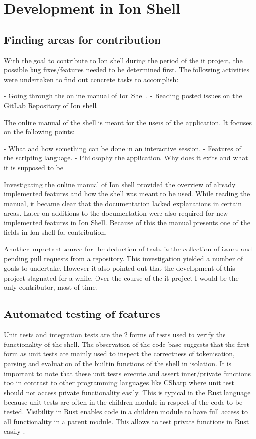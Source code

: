 \chapter{Development in Ion Shell}

\section{Finding areas for contribution}

With the goal to contribute to Ion shell during the period of the it project, the possible bug fixes/features needed to be determined first.
The following activities were undertaken to find out concrete tasks to accomplish:

- Going through the online manual of Ion Shell.
- Reading posted issues on the GitLab Repository of Ion shell.

The online manual of the shell is meant for the users of the application.
It focuses on the following points:

- What and how something can be done in an interactive session.
- Features of the scripting language.
- Philosophy the application. Why does it exits and what it is supposed to be.

Investigating the online manual of Ion shell provided the overview of already implemented features and how the shell was meant to be used.
While reading the manual, it became clear that the documentation lacked explanations in certain areas.
Later on additions to the documentation were also required for new implemented features in Ion Shell.
Because of this the manual presents one of the fields in Ion shell for contribution.

Another important source for the deduction of tasks is the collection of issues and pending pull requests from a repository.
This investigation yielded a number of goals to undertake.
However it also pointed out that the development of this project stagnated for a while.
Over the course of the it project I would be the only contributor, most of time.

\section{Automated testing of features}

Unit tests and integration tests are the 2 forms of tests used to verify the functionality of the shell.
The observation of the code base suggests that the first form as unit tests are mainly used to inspect the correctness of tokenisation, parsing and
evaluation of the builtin functions of the shell in isolation.
It is important to note that these unit tests execute and assert inner/private functions too
in contrast to other programming languages like CSharp where unit test should not access private functionality easily.
This is typical in the Rust language because unit tests are often in the children module in respect of the code to be tested.
Visibility in Rust enables code in a children module to have full access to all functionality in a parent module.
This allows to test private functions in Rust easily \cite{rust_testing_private_function}.

